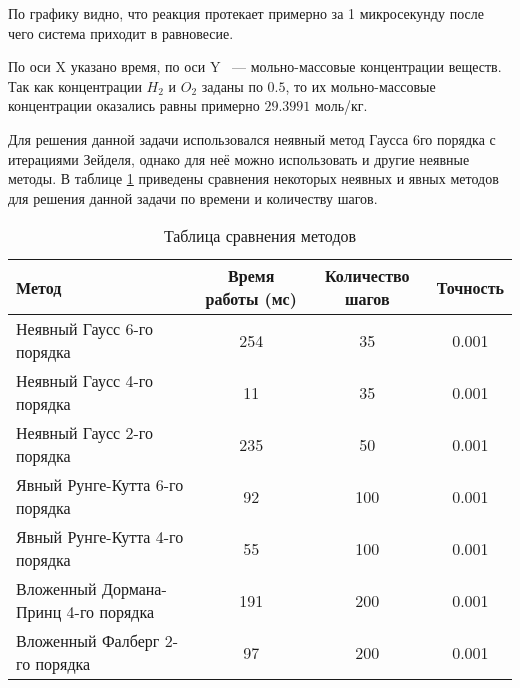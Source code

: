 %             


По графику видно, что реакция протекает примерно за 1 микросекунду после чего система приходит в равновесие.

По оси X указано время, по оси Y ~--- мольно-массовые концентрации веществ. Так как концентрации $H_2$ и $O_2$ заданы по $0.5$, то их
мольно-массовые концентрации оказались равны примерно $29.3991$ моль/кг.

Для решения данной задачи использовался неявный метод Гаусса 6го порядка с итерациями Зейделя, однако для неё можно использовать и
другие неявные методы. В таблице \ref{tab:Methods1} приведены сравнения некоторых неявных и явных методов для решения данной задачи по
времени и количеству шагов.

\begin{table}    
    \caption{Таблица сравнения методов}
    \begin{tabularx}{\textwidth}{|X|c|c|c|}
    \hline
    Метод & Время работы (мс) & Количество шагов & Точность\\
    \hline
    Неявный Гаусс 6-го порядка & 254 & 35 & 0.001\\
    \hline
    Неявный Гаусс 4-го порядка & 11 & 35 & 0.001\\
    \hline
    Неявный Гаусс 2-го порядка & 235 & 50 & 0.001\\
    \hline
    Явный Рунге-Кутта 6-го порядка & 92 & 100 & 0.001\\
    \hline
    Явный Рунге-Кутта 4-го порядка & 55 & 100 & 0.001\\
    \hline
    Вложенный Дормана-Принц 4-го порядка & 191 & 200 & 0.001\\
    \hline
    Вложенный Фалберг 2-го порядка & 97 & 200 & 0.001\\
    \hline
    \end{tabularx}
    \label{tab:Methods1}
\end{table}

